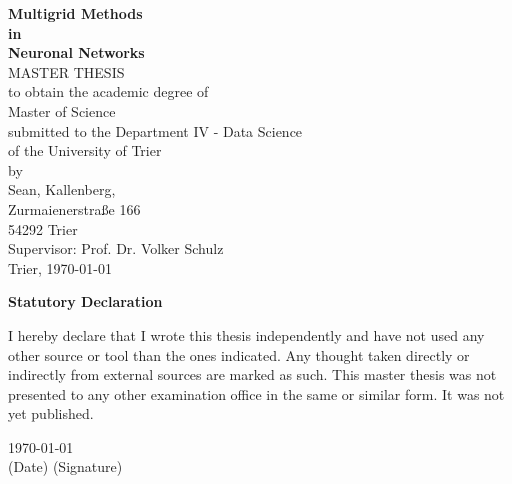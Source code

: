 \documentclass[a4paper,12pt,titlepage,enabledeprecatedfontcommands]{scrreprt}
\begin{document}
\begin{titlepage}
\phantom{erste Zeile}
\begin{center}
\Huge
\textbf{Multigrid Methods \\ in \\Neuronal Networks}\\
\vspace{0.5cm}
\large
\vspace{3cm}
MASTER THESIS \\
\vspace{0.5cm}
to obtain the academic degree of \\
Master of Science \\
\vspace{1cm}
submitted to the Department IV - Data Science\\
of the University of Trier \\
\vspace{2.5cm}
by \\
\vspace{1cm}
Sean, Kallenberg,\\
Zurmaienerstraße 166 \\
54292 Trier \\
\vspace{1cm}
Supervisor: Prof. Dr. Volker Schulz \\
\vspace{1cm}
Trier, \today         
\end{center}
\normalsize
\vfill
\end{titlepage}

\large
\vspace{2.5cm}
\begin{center}
\textbf{Statutory Declaration}\\
\end{center}
\vspace{0.5cm}
\normalsize
I hereby declare that I wrote this thesis independently and have not used any other source or tool than the ones indicated. Any thought taken directly or indirectly from external sources are marked as such. This master thesis was not presented to any other examination office in the same or similar form. It was not yet published.

\vspace{9cm}

\today\\             

\smallskip
\small\hspace{0cm}(Date) \hspace{8cm} (Signature)
\normalsize
\newpage
\end{document}
